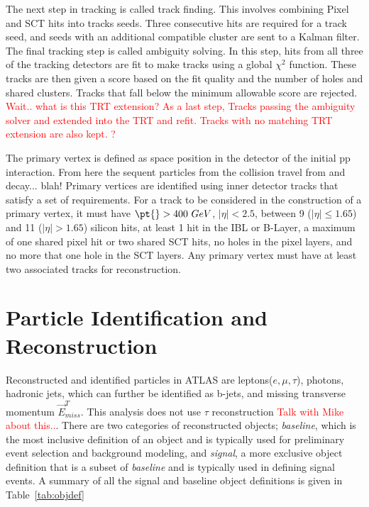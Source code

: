 The next step in tracking is called track finding.  This involves combining Pixel and SCT hits into tracks seeds.  Three consecutive hits are required for a track seed, and seeds with an additional compatible cluster are sent to a Kalman filter.  The final tracking step is called ambiguity solving.  In this step, hits from all three of the tracking detectors are fit to make tracks using a global $\chi^2$ function.  These tracks are then given a score based on the fit quality and the number of holes and shared clusters.  Tracks that fall below the minimum allowable score are rejected. \textcolor{red}{Wait.. what is this TRT extension?  As a last step, Tracks passing the ambiguity solver and extended into the TRT and refit. Tracks with no matching TRT extension are also kept.  ?} \cite{salz}
 
The primary vertex is defined as space position in the detector of the initial pp interaction.  From here the sequent particles from the collision travel from and decay... blah!  Primary vertices are identified using inner detector tracks that satisfy a set of requirements.  For a track to be considered in the construction of a primary vertex, it must have $ \pt{} > 400~GeV$, $|\eta| < 2.5$, between 9 ($|\eta| \leq 1.65$) and 11 ($|\eta| > 1.65$) silicon hits, at least 1 hit in the IBL or B-Layer, a maximum of one shared pixel hit or two shared SCT hits, no holes in the pixel layers, and no more that one hole in the SCT layers.  Any primary vertex must have at least two associated tracks for reconstruction.  %

\section{Particle Identification and Reconstruction}
\label{sec:obj:reco}

Reconstructed and identified particles in ATLAS are leptons($e, \mu, \tau$), photons, hadronic jets, which can further be identified as b-jets, and missing transverse momentum $\vec{E}^T_{miss}$.  This analysis does not use $\tau$ reconstruction \textcolor{red}{Talk with Mike about this..}. There are two categories of reconstructed objects; \textit{baseline}, which is the most inclusive definition of an object and is typically used for preliminary event selection and background modeling, and \textit{signal}, a more exclusive object definition that is a subset of \textit{baseline} and is typically used in defining signal events.  A summary of all the signal and baseline object definitions is given in Table~\ref{tab:objdef}

